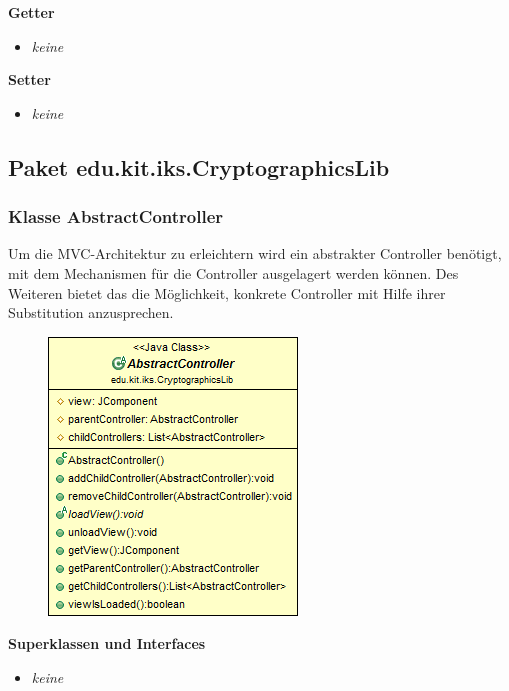 \documentclass{article}
\begin{document}
      \textbf{Getter}
      \begin{itemize}
        \item \textit{keine}
      \end{itemize}

      \textbf{Setter}
      \begin{itemize}
        \item \textit{keine}
      \end{itemize}

  \subsection{Paket edu.kit.iks.CryptographicsLib}
    
  	\subsubsection{Klasse AbstractController}
	  Um die MVC-Architektur zu erleichtern wird ein abstrakter Controller benötigt, mit dem Mechanismen
	  für die Controller ausgelagert werden können. Des Weiteren bietet das die Möglichkeit, konkrete
	  Controller mit Hilfe ihrer Substitution anzusprechen.
	
      \begin{figure}[H]
        \centering
        \includegraphics{resources/edu-kit-iks-CryptographicsLib-AbstractController}
      \end{figure}
	
      \textbf{Superklassen und Interfaces}
      \begin{itemize}
        \item \textit{keine}
      \end{itemize}
	
\end{document}
